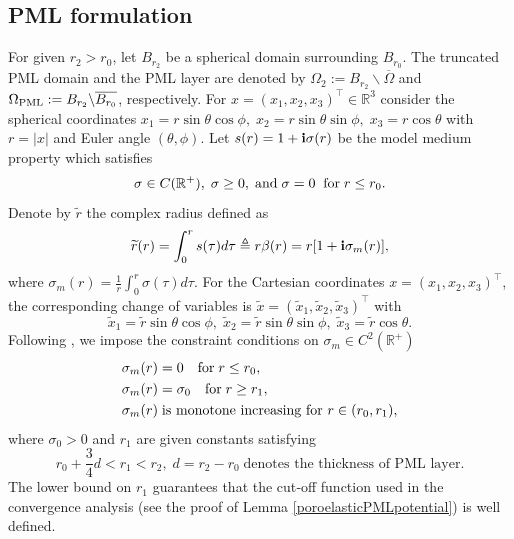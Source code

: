 \documentclass[11pt]{article}
\newcommand{\mat}{\mathbb}
\newcommand{\R}{{\mat R}}
\newcommand{\ba}{\backslash}
\newcommand{\ov}{\overline}
\newcommand{\Om}{\Omega}
\newcommand{\sig}{\sigma}
\newcommand{\wid}{\widetilde}
\newcommand{\PML}{{\rm PML}}
\begin{document}
\subsection{PML formulation}\label{subsec:PML form}
For given $r_2>r_0$, let $B_{r_2}$ be a spherical domain surrounding $B_{r_0}$.
The truncated PML domain and the PML layer are denoted by $\Om_2:=B_{r_2} \ba \overline{\Om}$ 
and $\Om_{\PML}:=B_{r_2} \ba \ov{B_{r_0}}$, respectively. 
For $x=(x_1,x_2,x_3)^{\top}\in\R^3$ consider the spherical coordinates
$x_1=r\sin\theta\cos\phi,\;x_2=r\sin\theta\sin\phi,\;
x_3=r\cos\theta$
with $r=|x|$ and Euler angle $(\theta,\phi)$.
Let $s(r)=1+{\bf i}\sig(r)$ be the model medium property which satisfies
\begin{equation*}
\sig\in C(\R^+),\;\sig\geq 0,\;{\rm and}\;\sig=0\;\;{\rm for}\;r\leq r_0.
\end{equation*}
Denote by $\wid{r}$ the complex radius defined as
\begin{equation}\label{stretched_r}
\wid{r}(r)=\int_0^{r}s(\tau)d\tau \triangleq r\beta(r) = r[1+{\bf i}\sig_m(r)],
\end{equation}
where $\sig_m(r)=\frac{1}{r}\int_0^r\sigma(\tau)d\tau$. For the Cartesian coordinates 
$x=(x_1,x_2,x_3)^{\top}$, the corresponding change of variables is $\wid{x}=(\wid{x}_1,\wid{x}_2,
\wid{x}_3)^{\top}$ with
\begin{equation}\label{stretched_x}
\wid{x}_1=\wid{r}\sin\theta\cos\phi,\;\wid{x}_2=\wid{r}\sin\theta\sin\phi,\;
\wid{x}_3=\wid{r}\cos\theta.
\end{equation}
Following \cite{BPT2010}, we impose the constraint conditions on $\sig_m\in C^2(\R^+)$
\begin{equation}\label{pmlcondition}
\begin{aligned}
&\sig_m(r)=0 \quad{\rm for}\; r \leq r_0,\\
&\sig_m(r)=\sig_0 \quad{\rm for}\; r \geq r_1,\\
&\sig_m(r)\; \text{is monotone  increasing for $r\in (r_0,r_1)$},
\end{aligned}
\end{equation}
where $\sig_0>0$ and $r_1$ are given constants satisfying
\begin{equation}\label{r1condition}
r_0 + \frac{3}{4}d < r_1 < r_2,\;d=r_2-r_0\;\text{denotes the thickness of PML layer}.
\end{equation}
The lower bound on $r_1$ guarantees that the cut‑off function used in the convergence analysis
 (see the proof of Lemma \ref{poroelasticPMLpotential}) is well defined.
\end{document}
